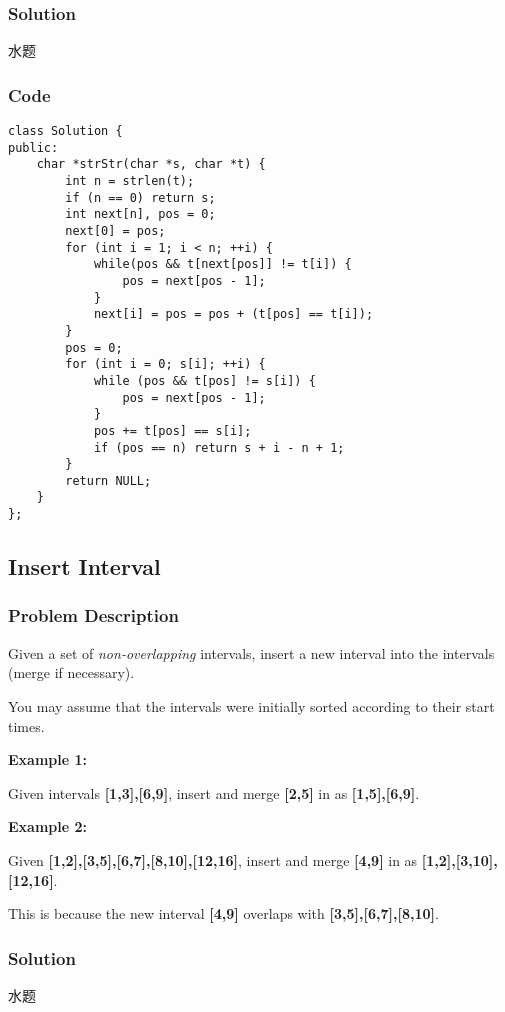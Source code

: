 \documentclass[courier]{article}
\begin{document}
\begin{CJK*}{UTF8}{gkai}
\subsubsection*{Solution}
水题

\subsubsection*{Code}
\begin{lstlisting}
class Solution {
public:
    char *strStr(char *s, char *t) {
        int n = strlen(t);
        if (n == 0) return s;
        int next[n], pos = 0;
        next[0] = pos;
        for (int i = 1; i < n; ++i) {
            while(pos && t[next[pos]] != t[i]) {
                pos = next[pos - 1];
            }
            next[i] = pos = pos + (t[pos] == t[i]);
        }
        pos = 0;
        for (int i = 0; s[i]; ++i) {
            while (pos && t[pos] != s[i]) {
                pos = next[pos - 1];
            }
            pos += t[pos] == s[i];
            if (pos == n) return s + i - n + 1;
        }
        return NULL;
    }
};

\end{lstlisting}


\subsection{ Insert Interval }

\subsubsection*{Problem Description}
Given a set of \emph{non-overlapping} intervals, insert a new interval into the intervals (merge if necessary).

You may assume that the intervals were initially sorted according to their start times.

\textbf{Example 1:}


Given intervals \textbf{[1,3],[6,9]}, insert and merge \textbf{[2,5]} in as \textbf{[1,5],[6,9]}.

\textbf{Example 2:}


Given \textbf{[1,2],[3,5],[6,7],[8,10],[12,16]}, insert and merge \textbf{[4,9]} in as \textbf{[1,2],[3,10],[12,16]}.

This is because the new interval \textbf{[4,9]} overlaps with \textbf{[3,5],[6,7],[8,10]}.



\subsubsection*{Solution}
水题


\end{CJK*}
\end{document}
